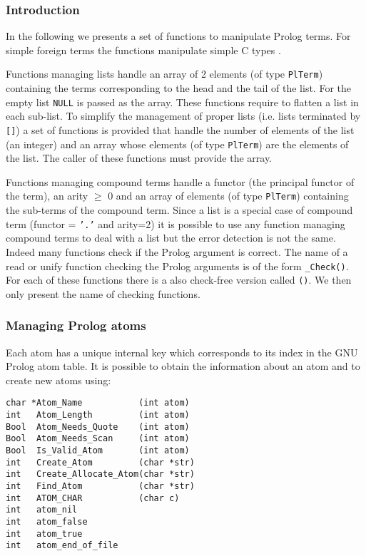 \subsubsection{Introduction}
\label{Introduction:(Manipulating-Prolog-terms)}
In the following we presents a set of functions to manipulate Prolog terms.
For simple foreign terms the functions manipulate simple C types
. 

Functions managing lists handle an array of 2 elements (of type
\texttt{PlTerm}) containing the terms corresponding to the head and the tail
of the list. For the empty list \texttt{NULL} is passed as the array. These
functions require to flatten a list in each sub-list. To simplify the
management of proper lists (i.e. lists terminated by \texttt{[]}) a set of
functions is provided that handle the number of elements of the list (an
integer) and an array whose elements (of type \texttt{PlTerm}) are the
elements of the list. The caller of these functions must provide the array.

Functions managing compound terms handle a functor (the principal functor of
the term), an arity  $\geq$ 0 and an array of  elements
(of type \texttt{PlTerm}) containing the sub-terms of the compound term.
Since a list is a special case of compound term (functor = \texttt{'.'} and
arity=2) it is possible to use any function managing compound terms to deal
with a list but the error detection is not the same. Indeed many functions
check if the Prolog argument is correct. The name of a read or unify
function checking the Prolog arguments is of the form
\texttt{\_Check()}. For each of these functions there is a also
check-free version called \texttt{()}. We then only present the
name of checking functions.

\subsubsection{Managing Prolog atoms}
Each atom has a unique internal key which corresponds to its index in the
GNU Prolog atom table. It is possible to obtain the information about an atom
and to create new atoms using:

\begin{Indentation}
\begin{verbatim}
char *Atom_Name           (int atom)
int   Atom_Length         (int atom)
Bool  Atom_Needs_Quote    (int atom)
Bool  Atom_Needs_Scan     (int atom)
Bool  Is_Valid_Atom       (int atom)
int   Create_Atom         (char *str)
int   Create_Allocate_Atom(char *str)
int   Find_Atom           (char *str)
int   ATOM_CHAR           (char c)
int   atom_nil
int   atom_false
int   atom_true
int   atom_end_of_file
\end{verbatim}
\end{Indentation}

